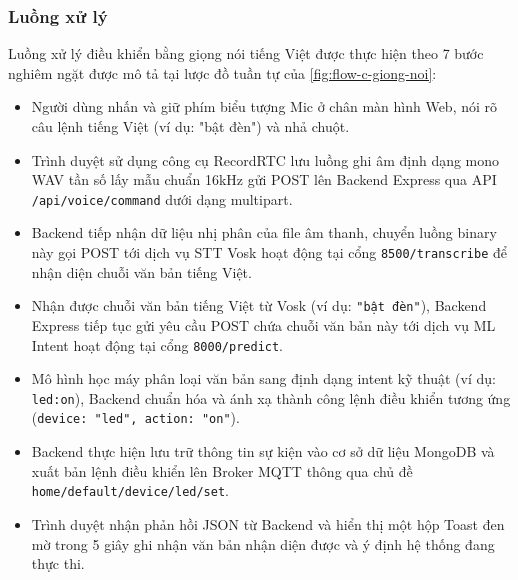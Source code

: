 \subsubsection{Luồng xử lý}
Luồng xử lý điều khiển bằng giọng nói tiếng Việt được thực hiện theo 7 bước nghiêm ngặt được mô tả tại lược đồ tuần tự của \autoref{fig:flow-c-giong-noi}:
\begin{itemize}
    \item Người dùng nhấn và giữ phím biểu tượng Mic ở chân màn hình Web, nói rõ câu lệnh tiếng Việt (ví dụ: "bật đèn") và nhả chuột.
    \item Trình duyệt sử dụng công cụ RecordRTC lưu luồng ghi âm định dạng mono WAV tần số lấy mẫu chuẩn 16kHz gửi POST lên Backend Express qua API \texttt{/api/voice/command} dưới dạng multipart.
    \item Backend tiếp nhận dữ liệu nhị phân của file âm thanh, chuyển luồng binary này gọi POST tới dịch vụ STT Vosk hoạt động tại cổng \texttt{8500/transcribe} để nhận diện chuỗi văn bản tiếng Việt.
    \item Nhận được chuỗi văn bản tiếng Việt từ Vosk (ví dụ: \texttt{"bật đèn"}), Backend Express tiếp tục gửi yêu cầu POST chứa chuỗi văn bản này tới dịch vụ ML Intent hoạt động tại cổng \texttt{8000/predict}.
    \item Mô hình học máy phân loại văn bản sang định dạng intent kỹ thuật (ví dụ: \texttt{led:on}), Backend chuẩn hóa và ánh xạ thành công lệnh điều khiển tương ứng (\texttt{device: "led", action: "on"}).
    \item Backend thực hiện lưu trữ thông tin sự kiện vào cơ sở dữ liệu MongoDB và xuất bản lệnh điều khiển lên Broker MQTT thông qua chủ đề \texttt{home/default/device/led/set}.
    \item Trình duyệt nhận phản hồi JSON từ Backend và hiển thị một hộp Toast đen mờ trong 5 giây ghi nhận văn bản nhận diện được và ý định hệ thống đang thực thi.
\end{itemize}


